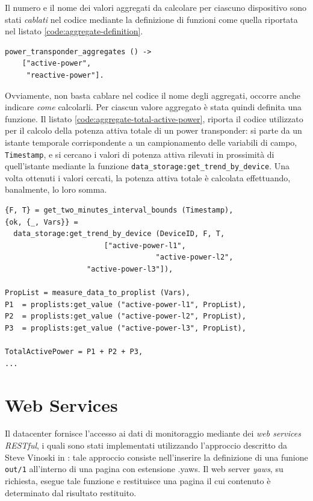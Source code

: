 %
Il numero e il nome dei valori aggregati da calcolare per ciascuno dispositivo
sono stati \emph{cablati} nel codice mediante la definizione di funzioni 
come quella riportata nel listato \ref{code:aggregate-definition}.
%
\begin{lstlisting}[caption={Definizione degli aggregati per il Power/Inverter Transponder}, label={code:aggregate-definition},frame=trBL]
power_transponder_aggregates () ->
    ["active-power",
     "reactive-power"].
\end{lstlisting}
%

%
Ovviamente, non basta cablare nel codice il nome degli aggregati, occorre anche 
indicare \emph{come} calcolarli.
%
Per ciascun valore aggregato \`e stata quindi definita una funzione.
%
Il listato \ref{code:aggregate-total-active-power}, riporta il codice 
utilizzato per il calcolo della potenza attiva totale di un power transponder: 
si parte da un istante temporale corrispondente a un campionamento delle variabili di 
campo, \texttt{Timestamp}, e si cercano i valori di potenza attiva rilevati in prossimit\`a
di quell'istante mediante la funzione \texttt{data\_storage:get\_trend\_by\_device}.
%
Una volta ottenuti i valori cercati, la potenza attiva totale \`e calcolata effettuando,
banalmente, lo loro somma.
%
\begin{lstlisting}[caption={Calcolo della potenza attiva totale}, label={code:aggregate-total-active-power},frame=trBL]
{F, T} = get_two_minutes_interval_bounds (Timestamp),
{ok, {_, Vars}} = 
  data_storage:get_trend_by_device (DeviceID, F, T, 
   			           ["active-power-l1",
                                   "active-power-l2",
				   "active-power-l3"]),
	      
PropList = measure_data_to_proplist (Vars),
P1  = proplists:get_value ("active-power-l1", PropList),
P2  = proplists:get_value ("active-power-l2", PropList),
P3  = proplists:get_value ("active-power-l3", PropList),
	      
TotalActivePower = P1 + P2 + P3, 
...
\end{lstlisting}
%

%
\section{Web Services}
Il datacenter fornisce l'accesso ai dati di monitoraggio mediante dei \emph{web services
RESTful}, i quali sono stati implementati utilizzando l'approccio descritto da Steve 
Vinoski in \cite{vinoski}: tale approccio consiste nell'inserire la definizione di una
funione \texttt{out/1} all'interno di una pagina con estensione .yaws.
%
Il web server \emph{yaws}, su richiesta, esegue tale funzione e restituisce una pagina il cui contenuto
\`e determinato dal risultato restituito.
%

